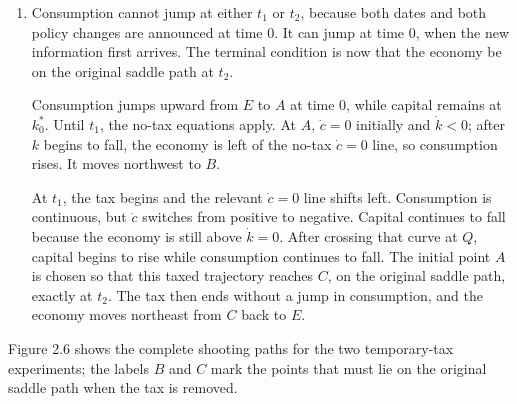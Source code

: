 \begin{solution}
\begin{enumerate}[label=(\alph*)]
    \item Consumption cannot jump at either \(t_1\) or \(t_2\), because
    both dates and both policy changes are announced at time 0. It can jump
    at time 0, when the new information first arrives. The terminal
    condition is now that the economy be on the original saddle path at
    \(t_2\).

    Consumption jumps upward from \(E\) to \(A\) at time 0, while capital
    remains at \(k^*_0\). Until \(t_1\), the no-tax equations apply. At
    \(A\), \(\dot c=0\) initially and \(\dot k<0\); after \(k\) begins to
    fall, the economy is left of the no-tax \(\dot c=0\) line, so
    consumption rises. It moves northwest to \(B\).

    At \(t_1\), the tax begins and the relevant \(\dot c=0\) line shifts
    left. Consumption is continuous, but \(\dot c\) switches from positive
    to negative. Capital continues to fall because the economy is still
    above \(\dot k=0\). After crossing that curve at \(Q\), capital begins
    to rise while consumption continues to fall. The initial point \(A\) is
    chosen so that this taxed trajectory reaches \(C\), on the original
    saddle path, exactly at \(t_2\). The tax then ends without a jump in
    consumption, and the economy moves northeast from \(C\) back to
    \(E\).
\end{enumerate}

Figure 2.6 shows the complete shooting paths for the two temporary-tax
experiments; the labels \(B\) and \(C\) mark the points that must lie on the
original saddle path when the tax is removed.

\begin{figure}[H]
    \centering
\end{figure}
\end{solution}
